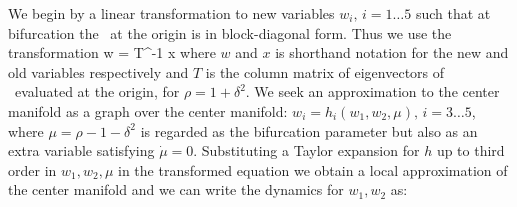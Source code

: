 We begin by a linear transformation to new variables $w_i,\, i=1\ldots 5$ such that at bifurcation
the \stabmat\ at the origin is in block-diagonal form. Thus we use the transformation
\beq
	w = T^{-1} x
\eeq
where $w$ and $x$ is shorthand notation for the new and old variables respectively and $T$ is the column matrix of
eigenvectors of \stabmat\ evaluated at the origin, for $\rho=1+\delta^2$. We seek an approximation to the center manifold
as a graph over the center manifold: $w_i = h_i(w_1,w_2,\mu),\, i=3\ldots5$, where $\mu=\rho-1-\delta^2$ is regarded
as the bifurcation parameter but also as an extra variable satisfying $\dot{\mu}=0$. Substituting a Taylor expansion for $h$
up to third order in $w_1,w_2,\mu$ in the transformed equation we obtain a local approximation of the center manifold
and we can write the dynamics for $w_1,w_2$ as:

